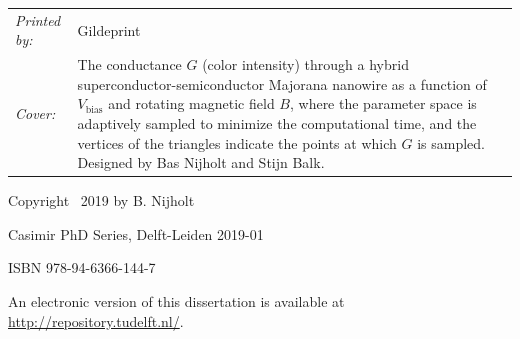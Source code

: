 \begin{titlepage}
\noindent
\begin{tabular}{@{}p{}@{}p{}}
    \textit{Printed by:} & Gildeprint \\[\medskipamount]
    \textit{Cover:} & The conductance $G$ (color intensity) through a hybrid superconductor-semiconductor Majorana nanowire as a function of $V_\textrm{bias}$ and rotating magnetic field $B$, where the parameter space is adaptively sampled to minimize the computational time, and the vertices of the triangles indicate the points at which $G$ is sampled.
    Designed by Bas Nijholt and Stijn Balk.  %
\end{tabular}

\vspace{1\bigskipamount}

\noindent Copyright \textcopyright\ 2019 by B. Nijholt

\medskip
\noindent Casimir PhD Series, Delft-Leiden 2019-01  %

\medskip
\noindent ISBN 978-94-6366-144-7  %

\medskip
\noindent An electronic version of this dissertation is available at \\
\url{http://repository.tudelft.nl/}.

\end{titlepage}
